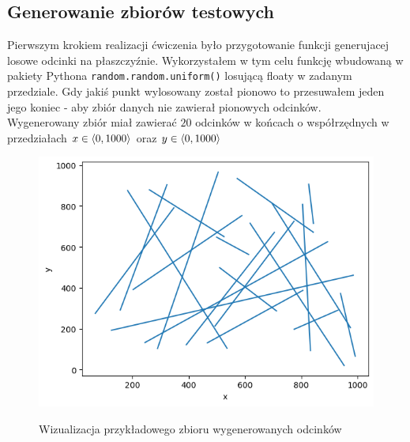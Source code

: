 \documentclass[a4paper]{article}
\begin{document}
\subsection{Generowanie zbiorów testowych}
    Pierwszym krokiem realizacji ćwiczenia było przygotowanie funkcji generujacej losowe odcinki 
    na płaszczyźnie. Wykorzystałem w tym celu funkcję wbudowaną w pakiety Pythona \verb|random.random.uniform()|
    losującą floaty w zadanym przedziale. Gdy jakiś punkt wylosowany został pionowo to przesuwałem jeden jego koniec -
    aby zbiór danych nie zawierał pionowych odcinków.\\
    Wygenerowany zbiór miał zawierać $20$ odcinków w końcach o współrzędnych w przedziałach $\large x \in \langle 0,1000 \rangle$ oraz $\large y \in \langle 0,1000\rangle$
    \begin{figure}[H]
        \centering
        \includegraphics{wizualizacje/random_segments.png}
        \label{fig:random_segments}
        \caption{Wizualizacja przykładowego zbioru wygenerowanych odcinków}
    \end{figure}
\end{document}

